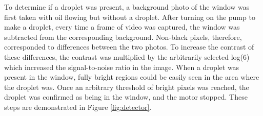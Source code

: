 \documentclass{physics_article_B}
\begin{document}
            To determine if a droplet was present, a background photo of the window was first taken with oil flowing but without a droplet. After turning on the pump to make a droplet, every time a frame of video was captured, the window was subtracted from the corresponding background. Non-black pixels, therefore, corresponded to differences between the two photos. To increase the contrast of these differences, the contrast was multiplied by the arbitrarily selected log(6) which increased the signal-to-noise ratio in the image. When a droplet was present in the window, fully bright regions could be easily seen in the area where the droplet was. Once an arbitrary threshold of bright pixels was reached, the droplet was confirmed as being in the window, and the motor stopped. These steps are demonstrated in Figure \ref{fig:detector}.
            
\end{document}
